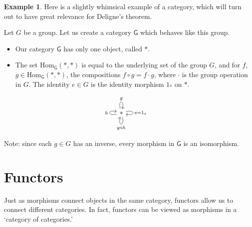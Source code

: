 \documentclass[a4paper]{report}
\newcommand{\Hom}{\mathrm{Hom}}
\theoremstyle{definition}
\newtheorem{example}{Example}[section]
\theoremstyle{plain}
\theoremstyle{remark}
\begin{document}
\begin{example}
  \label{eg:groupsaregroupoidswithoneobject}
  Here is a slightly whimsical example of a category, which will turn out to have great relevance for Deligne's theorem.

  Let $G$ be a group. Let us create a category $\mathsf{G}$ which behaves like this group.
  \begin{itemize}
    \item Our category $\mathsf{G}$ has only one object, called $*$.

    \item The set $\Hom_{\mathsf{G}}(*, *)$ is equal to the underlying set of the group $G$, and for $f$, $g \in \Hom_{\mathsf{G}}(*, *)$, the compositions $f \circ g = f\cdot g$, where $\cdot$ is the group operation in $G$. The identity $e \in G$ is the identity morphism $1_{*}$ on $*$.
  \end{itemize}
  \begin{equation*}
    \begin{tikzcd}
      *
      \arrow[loop right, "e = 1_{*}"]
      \arrow[loop above, "g"]
      \arrow[loop left, "h"]
      \arrow[loop below, "g \circ h"]
    \end{tikzcd}
  \end{equation*}

  Note: since each $g \in G$ has an inverse, every morphism in $\mathsf{G}$ is an isomorphism.
\end{example}

\section{Functors} \label{sec:functors}
Just as morphisms connect objects in the same category, functors allow us to connect different categories. In fact, functors can be viewed as morphisms in a `category of categories.'
\end{document}
